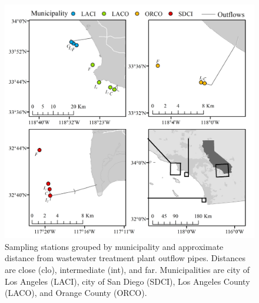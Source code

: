 \documentclass[letterpaper,12pt]{article}\usepackage[]{graphicx}\usepackage[]{color}
\begin{document}
\begin{figure}
\includegraphics[width = \textwidth]{figs/outflow_map.jpg}
\caption{Sampling stations grouped by municipality and approximate distance from wastewater treatment plant outflow pipes. Distances are close (clo), intermediate (int), and far. Municipalities are city of Los Angeles (LACI), city of San Diego (SDCI), Los Angeles County (LACO), and Orange County (ORCO).} 
\end{figure}
\end{document}
